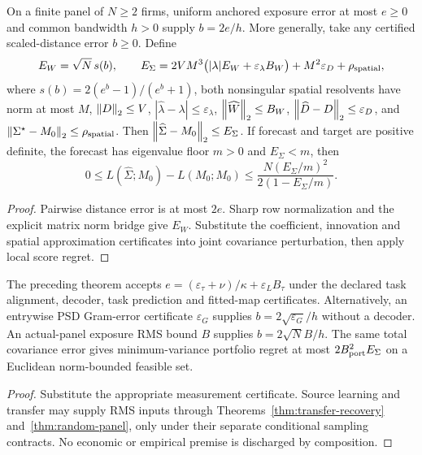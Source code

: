 \begin{theorem}\label{thm:end-to-end-measurement}
  \leanok
  On a finite panel of $N\ge2$ firms, uniform anchored exposure error at
  most $e\ge0$ and common bandwidth $h>0$ supply $b=2e/h$. More generally,
  take any certified scaled-distance error $b\ge0$. Define
  \[
    E_W=\sqrt N\,s(b),\qquad
    E_\Sigma=2VM^3\bigl(|\lambda|E_W+\varepsilon_\lambda B_W\bigr)
    +M^2\varepsilon_D+\rho_{\rm spatial},
  \]
  where $s(b)=2(e^b-1)/(e^b+1)$, both nonsingular spatial resolvents have
  norm at most $M$, $\left\lVert D\right\rVert_2\le V$,
  $|\widehat\lambda-\lambda|\le\varepsilon_\lambda$,
  $\left\lVert\widehat W\right\rVert_2\le B_W$, $\left\lVert\widehat D-D\right\rVert_2\le\varepsilon_D$,
  and $\left\lVert\Sigma^\star-M_0\right\rVert_2\le\rho_{\rm spatial}$.
  Then $\left\lVert\widehat\Sigma-M_0\right\rVert_2\le E_\Sigma$.
  If forecast and target are positive definite, the forecast has eigenvalue
  floor $m>0$ and $E_\Sigma<m$, then
  \[
    0\le L(\widehat\Sigma;M_0)-L(M_0;M_0)
    \le\frac{N(E_\Sigma/m)^2}{2(1-E_\Sigma/m)}.
  \]
\end{theorem}
\begin{proof}\leanok
  Pairwise distance error is at most $2e$. Sharp row normalization and the
  explicit matrix norm bridge give $E_W$. Substitute the coefficient,
  innovation and spatial approximation certificates into joint covariance
  perturbation, then apply local score regret.
\end{proof}

\begin{corollary}\label{thm:end-to-end-tasks}
  \leanok
  The preceding theorem accepts
  $e=(\varepsilon_\tau+\nu)/\kappa+\varepsilon_LB_\tau$
  under the declared task alignment, decoder, task prediction and fitted-map
  certificates. Alternatively, an entrywise PSD Gram-error certificate
  $\varepsilon_G$ supplies $b=2\sqrt{\varepsilon_G}/h$ without a decoder.
  An actual-panel exposure RMS bound $B$ supplies
  $b=2\sqrt N B/h$.
  The same total covariance error gives minimum-variance portfolio regret
  at most $2B_{\rm port}^2E_\Sigma$ on a Euclidean norm-bounded feasible set.
\end{corollary}
\begin{proof}\leanok
  Substitute the appropriate measurement certificate. Source learning and
  transfer may supply RMS inputs through Theorems~\ref{thm:transfer-recovery}
  and~\ref{thm:random-panel}, only under their separate conditional sampling
  contracts. No economic or empirical premise is discharged by composition.
\end{proof}

